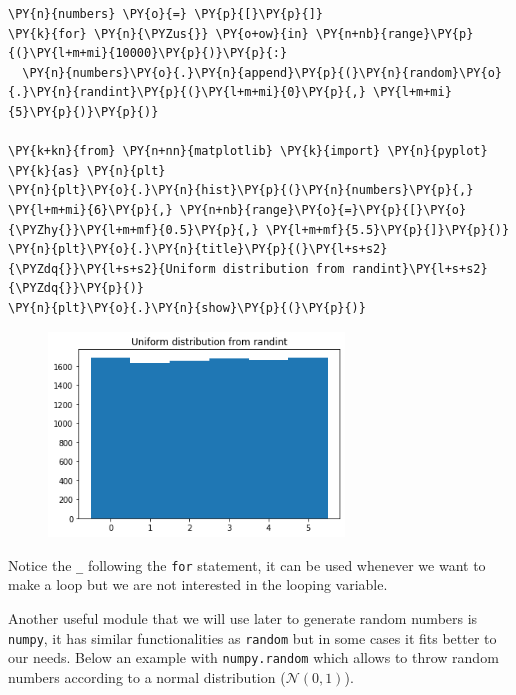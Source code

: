  \begin{tcolorbox}[breakable, size=fbox, boxrule=1pt, pad at break*=1mm,colback=cellbackground, colframe=cellborder]
\begin{Verbatim}[commandchars=\\\{\}]
\PY{n}{numbers} \PY{o}{=} \PY{p}{[}\PY{p}{]}
\PY{k}{for} \PY{n}{\PYZus{}} \PY{o+ow}{in} \PY{n+nb}{range}\PY{p}{(}\PY{l+m+mi}{10000}\PY{p}{)}\PY{p}{:}
  \PY{n}{numbers}\PY{o}{.}\PY{n}{append}\PY{p}{(}\PY{n}{random}\PY{o}{.}\PY{n}{randint}\PY{p}{(}\PY{l+m+mi}{0}\PY{p}{,} \PY{l+m+mi}{5}\PY{p}{)}\PY{p}{)}

\PY{k+kn}{from} \PY{n+nn}{matplotlib} \PY{k}{import} \PY{n}{pyplot} \PY{k}{as} \PY{n}{plt}
\PY{n}{plt}\PY{o}{.}\PY{n}{hist}\PY{p}{(}\PY{n}{numbers}\PY{p}{,} \PY{l+m+mi}{6}\PY{p}{,} \PY{n+nb}{range}\PY{o}{=}\PY{p}{[}\PY{o}{\PYZhy{}}\PY{l+m+mf}{0.5}\PY{p}{,} \PY{l+m+mf}{5.5}\PY{p}{]}\PY{p}{)}
\PY{n}{plt}\PY{o}{.}\PY{n}{title}\PY{p}{(}\PY{l+s+s2}{\PYZdq{}}\PY{l+s+s2}{Uniform distribution from randint}\PY{l+s+s2}{\PYZdq{}}\PY{p}{)}
\PY{n}{plt}\PY{o}{.}\PY{n}{show}\PY{p}{(}\PY{p}{)}
\end{Verbatim}
\end{tcolorbox}

\begin{figure}[h]
\centering
\includegraphics[width=0.7\textwidth]{lecture_6_files/lecture_6_28_0.png}
\end{figure}
Notice the \texttt{\_} following the \texttt{for} statement, it can be used whenever we want to make a loop but we are not interested in the looping variable. 
    
Another useful module that we will use later to generate random numbers is \texttt{numpy}, it has similar functionalities as \texttt{random} but in some cases it fits better to our needs.    
Below an example with \texttt{numpy.random} which allows to throw random numbers according to a normal distribution
(\(\mathcal{N}(0, 1)\)).

